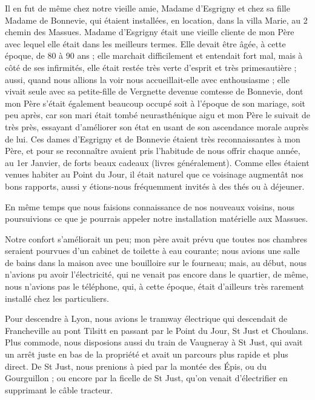 \documentclass[11pt,a4paper]{report}
\begin{document}
Il en fut de même chez notre vieille amie, Madame d'Esgrigny et chez sa fille Madame de Bonnevie, qui étaient installées, en location, dans la villa Marie, au 2 chemin des Massues. Madame d'Esgrigny était une vieille cliente de mon Père avec lequel elle était dans les meilleurs termes. Elle devait être âgée, à cette époque, de 80 à 90 ans ; elle marchait difficilement et entendait fort mal, mais à côté de ses infirmités, elle était restée très verte d'esprit et très primesautière ; aussi, quand nous allions la voir nous accueillait-elle avec enthousiasme ; elle vivait seule avec sa petite-fille de Vergnette devenue comtesse de Bonnevie, dont mon Père s'était également beaucoup occupé soit à l'époque de son mariage, soit peu après, car son mari était tombé neurasthénique aigu et mon Père le suivait de très près, essayant d'améliorer son état en usant de son ascendance morale auprès de lui. Ces dames d'Esgrigny et de Bonnevie étaient très reconnaissantes à mon Père, et pour se reconnaître avaient pris l'habitude de nous offrir chaque année, au 1er Janvier, de forts beaux cadeaux (livres généralement). Comme elles étaient venues habiter au Point du Jour, il était naturel que ce voisinage augmentât nos bons rapports, aussi y étions-nous fréquemment invités à des thés ou à déjeuner.

En même temps que nous faisions connaissance de nos nouveaux voisins, nous poursuivions ce que je pourrais appeler notre installation matérielle aux Massues.

Notre confort s'améliorait un peu; mon père avait prévu que toutes nos chambres seraient pourvues d'un cabinet de toilette à eau courante; nous avions une salle de bains dans la maison avec une bouilloire sur le fourneau; mais, au début, nous n'avions pu avoir l'électricité, qui ne venait pas encore dans le quartier, de même, nous n'avions pas le téléphone, qui, à cette époque, était d'ailleurs très rarement installé chez les particuliers.

Pour descendre à Lyon, nous avions le tramway électrique qui descendait de Francheville au pont Tilsitt en passant par le Point du Jour, St Just et Choulans. Plus commode, nous disposions aussi du train de Vaugneray à St Just, qui avait un arrêt juste en bas de la propriété et avait un parcours plus rapide et plus direct. De St Just, nous prenions à pied par la montée des Épis, ou du Gourguillon ; ou encore par la ficelle de St Just, qu'on venait d'électrifier en supprimant le câble tracteur.
\end{document}
